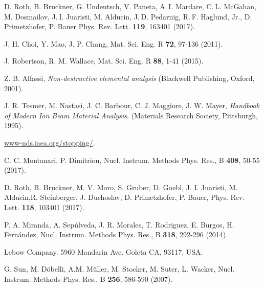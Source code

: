 \begin{thebibliography}{9}
D. Roth, B. Bruckner, G. Undeutsch, V. Paneta, A. I. Mardare, 
C. L. McGahan, M. Dosmailov, J. I. Juaristi, M. Alducin, 
J. D. Pedarnig, R. F. Haglund, Jr., D. Primetzhofer, P. Bauer
Phys. Rev. Lett. \textbf{119}, 163401 (2017).

J. H. Choi, Y. Mao, J. P. Chang, 
Mat. Sci. Eng. R \textbf{72}, 97-136 (2011).

J. Robertson, R. M. Wallace, 
Mat. Sci. Eng. R \textbf{88}, 1-41 (2015).

Z. B. Alfassi,
\textit{Non-destructive elemental analysis}
(Blackwell Publishing, Oxford, 2001).

J. R. Tesmer, M. Nastasi, J. C. Barbour, C. J. Maggiore, J. W. Mayer,
\textit{Handbook of Modern Ion Beam Material Analysis}.
(Materials Research Society, Pittsburgh, 1995).

\href{https://www-nds.iaea.org/stopping/}{www-nds.iaea.org/stopping/}.

C. C. Montanari, P. Dimitriou, 
Nucl. Instrum. Methods Phys. Res., B \textbf{408},  50-55 (2017).

D. Roth, B. Bruckner, M. V. Moro, S. Gruber, D. Goebl, J. I. Juaristi, 
M. Alducin,R. Steinberger, J. Duchoslav, D. Primetzhofer, P. Bauer, 
Phys. Rev. Lett. \textbf{118}, 103401 (2017).

\begin{comment}
\bibitem{zenodo} 
C.C. Montanari \textit{et al.} DOI: 10.5281/zenodo.3678785 
\end{comment}
P. A. Miranda, A. Sep\'ulveda, J. R. Morales, T. Rodriguez, E. Burgos, 
H. Fern\'andez,
Nucl. Instrum. Methods Phys. Res., B \textbf{318}, 292-296  (2014).

Lebow Company. 5960 Mandarin Ave. Goleta CA, 93117, USA.

G. Sun, M. D\"{o}belli, A.M. M\"{u}ller, M. Stocker, M. Suter, L. Wacker, 
Nucl. Instrum. Methods Phys. Res., B \textbf{256}, 586-590 (2007).


\end{thebibliography}
